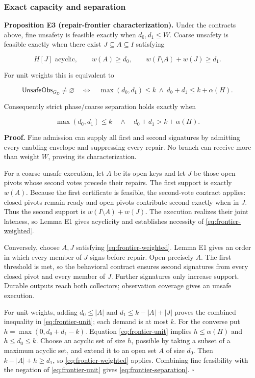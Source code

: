 \subsubsection{Exact capacity and
separation}\label{exact-capacity-and-separation}

\textbf{Proposition E3 (repair-frontier characterization).} Under the
contracts above, fine unsafety is feasible exactly when
\(d_0,d_1\le W\). Coarse unsafety is feasible exactly when there exist
\(J\subseteq A\subseteq I\) satisfying

\[
H[J]\text{ acyclic},\qquad w(A)\ge d_0,
\qquad w(I\setminus A)+w(J)\ge d_1. \tag{E1}\label{eq:frontier-weighted}
\]

For unit weights this is equivalent to

\[
\mathsf{UnsafeObs}_{G_D}\ne\varnothing
\quad\Longleftrightarrow\quad
\max(d_0,d_1)\le k\ \land\ d_0+d_1\le k+\alpha(H). \tag{E2}\label{eq:frontier-unit}
\]

Consequently strict phase/coarse separation holds exactly when

\[
\boxed{\max(d_0,d_1)\le k\quad\land\quad
 d_0+d_1>k+\alpha(H).} \tag{E3}\label{eq:frontier-separation}
\]

\textbf{Proof.} Fine admission can supply all first and second
signatures by admitting every enabling envelope and suppressing every
repair. No branch can receive more than weight \(W\), proving its
characterization.

For a coarse unsafe execution, let \(A\) be its open keys and let \(J\)
be those open pivots whose second votes precede their repairs. The first
support is exactly \(w(A)\). Because the first certificate is feasible,
the second-vote contract applies: closed pivots remain ready and open
pivots contribute second exactly when in \(J\). Thus the second support
is \(w(I\setminus A)+w(J)\). The execution realizes their joint
lateness, so Lemma E1 gives acyclicity and establishes necessity of
\eqref{eq:frontier-weighted}.

Conversely, choose \(A,J\) satisfying \eqref{eq:frontier-weighted}.
Lemma E1 gives an order in which every member of \(J\) signs before
repair. Open precisely \(A\). The first threshold is met, so the
behavioral contract ensures second signatures from every closed pivot
and every member of \(J\). Further signatures only increase support.
Durable outputs reach both collectors; observation coverage gives an
unsafe execution.

For unit weights, adding \(d_0\le|A|\) and \(d_1\le k-|A|+|J|\) proves
the combined inequality in \eqref{eq:frontier-unit}; each demand is at
most \(k\). For the converse put \(h=\max(0,d_0+d_1-k)\). Equation
\eqref{eq:frontier-unit} implies \(h\le\alpha(H)\) and
\(h\le d_0\le k\). Choose an acyclic set of size \(h\), possible by
taking a subset of a maximum acyclic set, and extend it to an open set
\(A\) of size \(d_0\). Then \(k-|A|+h\ge d_1\), so
\eqref{eq:frontier-weighted} applies. Combining fine feasibility with
the negation of \eqref{eq:frontier-unit} gives
\eqref{eq:frontier-separation}. \(\square\)

